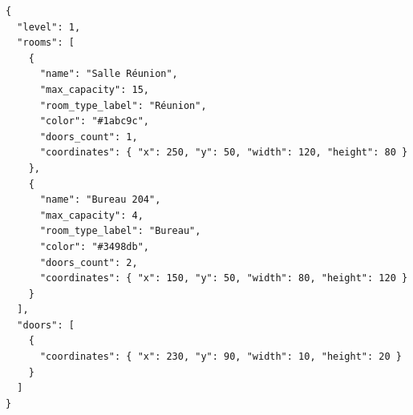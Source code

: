 \begin{verbatim}
{
  "level": 1,
  "rooms": [
    {
      "name": "Salle Réunion",
      "max_capacity": 15,
      "room_type_label": "Réunion",
      "color": "#1abc9c",
      "doors_count": 1,
      "coordinates": { "x": 250, "y": 50, "width": 120, "height": 80 }
    },
    {
      "name": "Bureau 204",
      "max_capacity": 4,
      "room_type_label": "Bureau",
      "color": "#3498db",
      "doors_count": 2,
      "coordinates": { "x": 150, "y": 50, "width": 80, "height": 120 }
    }
  ],
  "doors": [
    {
      "coordinates": { "x": 230, "y": 90, "width": 10, "height": 20 }
    }
  ]
}
\end{verbatim}